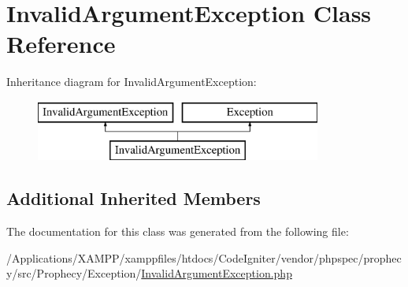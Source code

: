 \hypertarget{class_prophecy_1_1_exception_1_1_invalid_argument_exception}{}\section{Invalid\+Argument\+Exception Class Reference}
\label{class_prophecy_1_1_exception_1_1_invalid_argument_exception}
Inheritance diagram for Invalid\+Argument\+Exception\+:\begin{figure}[H]
\begin{center}
\leavevmode
\includegraphics[height=2.000000cm]{class_prophecy_1_1_exception_1_1_invalid_argument_exception}
\end{center}
\end{figure}
\subsection*{Additional Inherited Members}


The documentation for this class was generated from the following file\+:\begin{DoxyCompactItemize}
\item 
/\+Applications/\+X\+A\+M\+P\+P/xamppfiles/htdocs/\+Code\+Igniter/vendor/phpspec/prophecy/src/\+Prophecy/\+Exception/\mbox{\hyperlink{phpspec_2prophecy_2src_2_prophecy_2_exception_2_invalid_argument_exception_8php}{Invalid\+Argument\+Exception.\+php}}\end{DoxyCompactItemize}
